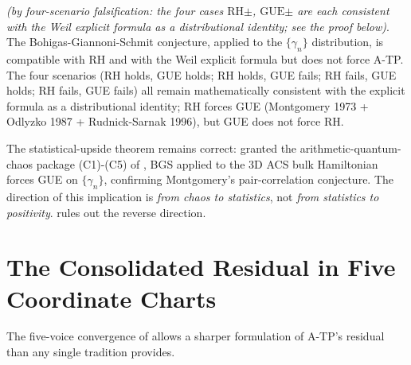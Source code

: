 \begin{theorem}
\label{v4-arith:w8-atp:thm:BGS-downstream}
\ClaimStatusProvedHere \emph{(by four-scenario falsification: the four
cases \(\mathrm{RH}\)\(\pm\), \(\mathrm{GUE}\)\(\pm\) are each
consistent with the Weil explicit formula as a distributional identity;
see the proof below)}. The Bohigas-Giannoni-Schmit
conjecture, applied to the \(\{\gamma_n\}\) distribution, is compatible
with RH and with the Weil explicit formula but does not force A-TP.
The four scenarios (RH holds, GUE holds; RH holds, GUE fails; RH
fails, GUE holds; RH fails, GUE fails) all remain mathematically
consistent with the explicit formula as a distributional identity;
RH forces GUE (Montgomery 1973 + Odlyzko 1987 + Rudnick-Sarnak 1996),
but GUE does not force RH.
\end{theorem}

\begin{remark}
\label{v4-arith:w8-atp:rem:statistical-upside-unchanged}
The statistical-upside theorem
 remains correct: granted the
arithmetic-quantum-chaos package (C1)-(C5) of
, BGS applied to the 3D ACS bulk
Hamiltonian forces GUE on \(\{\gamma_n\}\), confirming Montgomery's
pair-correlation conjecture. The direction of this implication is
\emph{from chaos to statistics}, not \emph{from statistics to
positivity}.  rules out the
reverse direction.
\end{remark}

\section{The Consolidated Residual in Five Coordinate Charts}
\label{v4-arith:w8-atp:residual}

The five-voice convergence of 
allows a sharper formulation of A-TP's residual than any single
tradition provides.

